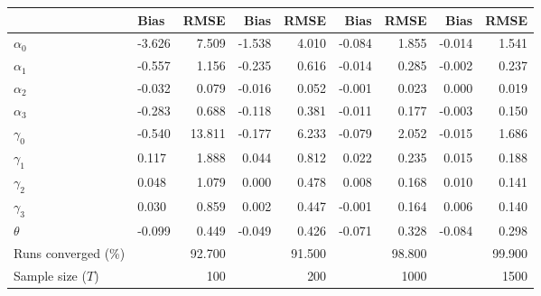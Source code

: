 
\begin{tabular}[t]{llrrrrrrr}
\toprule
  & Bias & RMSE & Bias & RMSE & Bias & RMSE & Bias & RMSE\\
\midrule
$\alpha_{0}$ & -3.626 & 7.509 & -1.538 & 4.010 & -0.084 & 1.855 & -0.014 & 1.541\\
$\alpha_{1}$ & -0.557 & 1.156 & -0.235 & 0.616 & -0.014 & 0.285 & -0.002 & 0.237\\
$\alpha_{2}$ & -0.032 & 0.079 & -0.016 & 0.052 & -0.001 & 0.023 & 0.000 & 0.019\\
$\alpha_{3}$ & -0.283 & 0.688 & -0.118 & 0.381 & -0.011 & 0.177 & -0.003 & 0.150\\
$\gamma_{0}$ & -0.540 & 13.811 & -0.177 & 6.233 & -0.079 & 2.052 & -0.015 & 1.686\\
$\gamma_{1}$ & 0.117 & 1.888 & 0.044 & 0.812 & 0.022 & 0.235 & 0.015 & 0.188\\
$\gamma_{2}$ & 0.048 & 1.079 & 0.000 & 0.478 & 0.008 & 0.168 & 0.010 & 0.141\\
$\gamma_{3}$ & 0.030 & 0.859 & 0.002 & 0.447 & -0.001 & 0.164 & 0.006 & 0.140\\
$\theta$ & -0.099 & 0.449 & -0.049 & 0.426 & -0.071 & 0.328 & -0.084 & 0.298\\
Runs converged (\%) &  & 92.700 &  & 91.500 &  & 98.800 &  & 99.900\\
Sample size ($T$) &  & 100 &  & 200 &  & 1000 &  & 1500\\
\bottomrule
\end{tabular}
